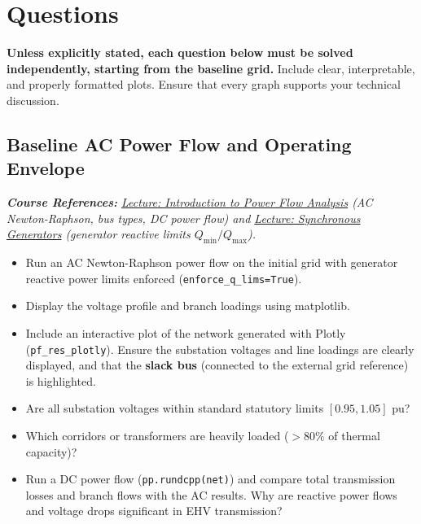 \documentclass[11pt]{article}
\begin{document}
\section{Questions}

\textbf{Unless explicitly stated, each question below must be solved independently, starting from the baseline grid.} 
Include clear, interpretable, and properly formatted plots. Ensure that every graph supports your technical discussion.

\subsection{Baseline AC Power Flow and Operating Envelope}
  \noindent\textit{\textbf{Course References:} \href{https://github.com/bcornelusse/ELEC0447-analysis-power-systems/blob/master/Lectures/IntroPowerFlow/main.pdf}{Lecture: Introduction to Power Flow Analysis} (AC Newton-Raphson, bus types, DC power flow) and \href{https://github.com/bcornelusse/ELEC0447-analysis-power-systems/blob/master/Lectures/SynchronousGenerator/main.pdf}{Lecture: Synchronous Generators} (generator reactive limits $Q_{\min}/Q_{\max}$).}
  \begin{itemize}
    \item Run an AC Newton-Raphson power flow on the initial grid with generator reactive power limits enforced (\lstinline|enforce_q_lims=True|).
    \item Display the voltage profile and branch loadings using matplotlib.
    \item Include an interactive plot of the network generated with Plotly (\lstinline|pf_res_plotly|). Ensure the substation voltages and line loadings are clearly displayed, and that the \textbf{slack bus} (connected to the external grid reference) is highlighted.
    \item Are all substation voltages within standard statutory limits $[0.95, 1.05]\text{ pu}$? 
    \item Which corridors or transformers are heavily loaded ($>80\%$ of thermal capacity)?
    \item Run a DC power flow (\lstinline|pp.rundcpp(net)|) and compare total transmission losses and branch flows with the AC results. Why are reactive power flows and voltage drops significant in EHV transmission?
  \end{itemize}
\end{document}
